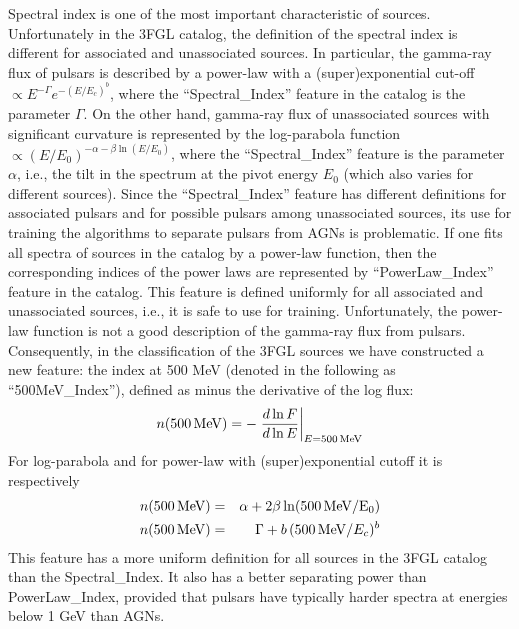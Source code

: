 \documentclass{aa}
\newcommand{\bea}{\begin{eqnarray}}
\newcommand{\eea}{\end{eqnarray}}
\newcommand{\lb}{\label}
\newcommand{\al}{\alpha}
\newcommand{\bt}{\beta}
\begin{document}
Spectral index is one of the most important characteristic of sources. 
Unfortunately in the 3FGL catalog, the definition of the spectral index is different for associated and unassociated sources.
In particular, the gamma-ray flux of pulsars is described by a power-law with a (super)exponential cut-off $\propto E^{-\Gamma} e^{-(E / E_c)^b}$, where the ``Spectral\_Index'' feature in the catalog is the parameter $\Gamma$.
On the other hand, gamma-ray flux of unassociated sources with significant curvature is represented by the log-parabola function $\propto (E/E_0)^{-\al - \bt \ln (E/E_0)}$,
where the ``Spectral\_Index'' feature is the parameter $\al$, i.e., the tilt in the spectrum at the pivot energy $E_0$ (which also varies for different sources).
Since the ``Spectral\_Index'' feature has different definitions for associated pulsars and for possible pulsars among unassociated sources,
its use for training the algorithms to separate pulsars from AGNs is problematic.
If one fits all spectra of sources in the catalog by a power-law function, then the corresponding indices of the power laws are represented by
``PowerLaw\_Index'' feature in the catalog.
This feature is defined uniformly for all associated and unassociated sources, i.e., it is safe to use for training.
Unfortunately, the power-law function is not a good description of the gamma-ray flux from pulsars.
Consequently, in the classification of the 3FGL sources we have constructed a new feature: the index at 500 MeV (denoted in the following as ``500MeV\_Index''), defined as minus the derivative of the log flux:
\bea
\lb{eq:n500_def}
n({\rm 500\,MeV}) = - \left. \frac{d \ln F}{d \ln E} \right|_{E = \rm 500\,MeV}
\eea
For log-parabola and for power-law with (super)exponential cutoff it is respectively
\bea
n(\rm 500\,MeV) &=& \al + 2 \bt \ln(\rm 500\,MeV / E_0)    \\
n({\rm 500\,MeV}) &=& \Gamma + b\,({\rm 500\,MeV} / E_c)^b
\eea
This feature has a more uniform definition for all sources in the 3FGL catalog than the Spectral\_Index. It also has a better separating power 
than PowerLaw\_Index, provided that pulsars have typically harder spectra at energies below 1 GeV than AGNs.
\end{document}
